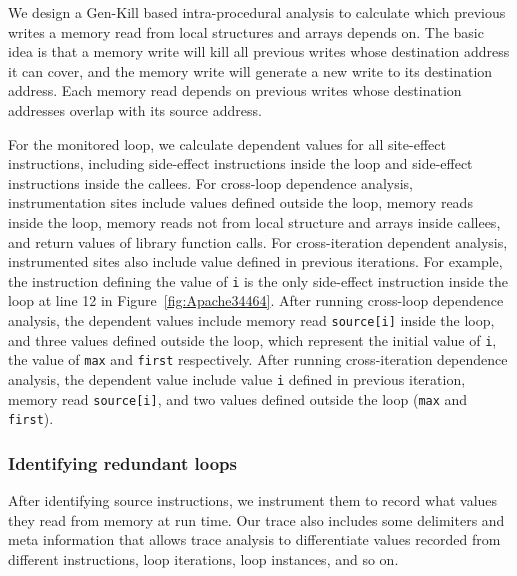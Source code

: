 {We design a Gen-Kill based intra-procedural analysis to 
calculate which previous writes a memory read from local structures and arrays depends on. 
The basic idea is that a memory write will kill all previous writes whose destination address it can cover, 
and the memory write will generate a new write to its destination address. 
Each memory read depends on previous writes whose destination addresses overlap with its source address. 

For the monitored loop, we calculate dependent values for all site-effect instructions, 
including side-effect instructions inside the loop and side-effect instructions inside the callees. 
For cross-loop dependence analysis, instrumentation sites include values defined outside the loop, 
memory reads inside the loop, memory reads not from local structure and arrays inside callees, 
and return values of library function calls. 
For cross-iteration dependent analysis, instrumented sites also include value defined in previous iterations. 
For example, the instruction defining the value of \texttt{i} is the only side-effect instruction 
inside the loop at line 12 in Figure~\ref{fig:Apache34464}. 
After running cross-loop dependence analysis, the dependent values include 
memory read \texttt{source[i]} inside the loop, 
and three values defined outside the loop, 
which represent the initial value of \texttt{i}, the value of \texttt{max} and \texttt{first} respectively. 
After running cross-iteration dependence analysis, 
the dependent value include value \texttt{i} defined in previous iteration, 
memory read \texttt{source[i]}, 
and two values defined outside the loop (\texttt{max} and \texttt{first}).  

}

\subsubsection{Identifying redundant loops}
\label{sec:cal}

After identifying source instructions, we instrument them to record
what values they read from memory
at run time.
Our trace also includes some delimiters and meta information that allows
trace analysis to differentiate values recorded from different instructions, 
loop
iterations, loop instances, and so on.



